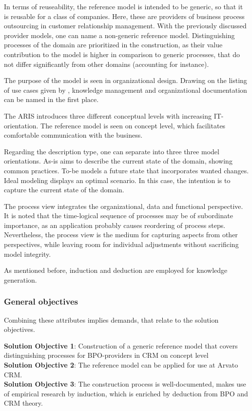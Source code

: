 In terms of reuseability, the reference model is intended to be generic, so that it is reusable for a class of companies. Here, these are providers of business process outsourcing in customer relationship management. With the previously discussed provider models, one can name a non-generic reference model. Distinguishing processes of the domain are prioritized in the construction, as their value contribution to the model is higher in comparison to generic processes, that do not differ significantly from other domains (accounting for instance).  

The purpose of the model is seen in organizational design. Drawing on the listing of use cases given by \cite{Rosemann2012proc}, knowledge management and organizational documentation can be named in the first place. 

The \acrshort{ARIS} introduces three different conceptual levels with increasing IT-orientation. The reference model is seen on concept level, which facilitates comfortable communication with the business. 
\todo{+++}

Regarding the description type, one can separate into three three model orientations. As-is aims to describe the current state of the domain, \viz showing common practices. To-be models a future state that incorporates wanted changes.  Ideal modeling displays an optimal scenario. In this case, the intention is to capture the current state of the domain. 

The process view integrates the organizational, data and functional perspective. It is noted that the time-logical sequence of processes may be of subordinate importance, as an application probably causes reordering of process steps. Nevertheless, the process view is the medium for capturing aspects from other perspectives, while leaving room for individual adjustments without sacrificing model integrity. 

As mentioned before, induction and deduction are employed for knowledge generation.
 
\subsubsection{General objectives}
Combining these attributes implies demands, that relate to the solution objectives.

\hfill\begin{minipage}{\dimexpr\textwidth-1.2cm}
	\textbf{Solution Objective 1}: Construction of a generic  reference model that covers distinguishing processes for BPO-providers in CRM on concept level
	\\
	
	\textbf{Solution Objective 2}: The reference model can be applied for use at Arvato CRM.  
	\\
	
	\textbf{Solution Objective 3}: The construction  process is well-documented, makes use of empirical research by induction, which is enriched by deduction from \acrshort{BPO} and \acrshort{CRM} theory.
	
	\xdef\tpd{\the\prevdepth}
\end{minipage}

